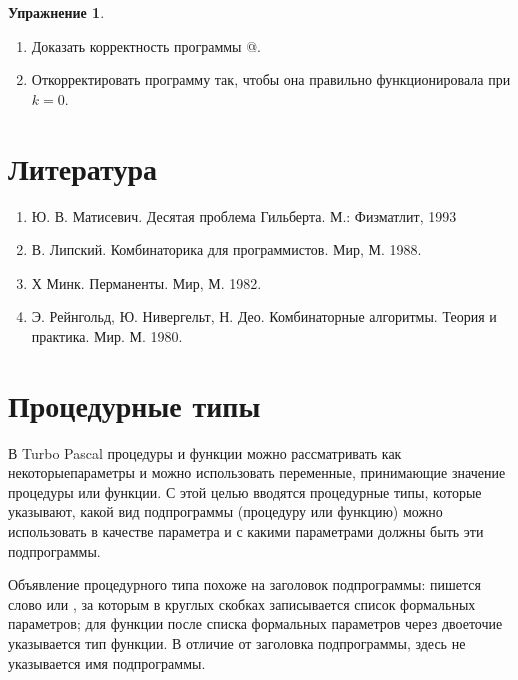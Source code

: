 \documentclass[12pt,a4paper]{article}
\theoremstyle{plain}
\theoremstyle{definition}
\newtheorem*{task}{Упражнение}
\theoremstyle{remark}
\newtheorem*{comment}{Комментарий}
\begin{document}
\begin{comment}
Стек реализуется таким же способом, как в \verb@SET4@. \verb@t[1]@ указывает на узел в вершине стека, и каждый элемент \verb@t[j]@ в стеке немедленно получает новое значение, как только он исключается из стека. Присваивания \verb@{1}@ и \verb@{2}@ служат для добавления в стек $m-1,\ldots,h+1$.
\end{comment}

\begin{task}
~\\
\begin{enumerate}
\item Доказать корректность программы @.
\item Откорректировать программу так, чтобы она правильно функционировала при $k=0$.
\end{enumerate}
\end{task}

\section*{Литература}
\begin{enumerate}
\item Ю. В. Матисевич. Десятая проблема Гильберта. М.: Физматлит, 1993
\item В. Липский. Комбинаторика для программистов. Мир, М. 1988.
\item Х Минк. Перманенты. Мир, М. 1982.
\item Э. Рейнгольд, Ю. Нивергельт, Н. Део. Комбинаторные алгоритмы. Теория и
практика. Мир. М. 1980.
\end{enumerate}

\section{Процедурные типы}

В Turbo Pascal процедуры и функции можно рассматривать как некоторыепараметры и можно использовать переменные, принимающие значение процедуры или функции. С этой целью вводятся процедурные типы, которые указывают, какой вид подпрограммы (процедуру или функцию) можно использовать в качестве параметра и с какими параметрами должны быть эти подпрограммы.

Объявление процедурного типа похоже на заголовок подпрограммы: пишется слово \verb@procedure@ или \verb@function@, за которым в круглых скобках записывается список формальных параметров; для функции после списка формальных параметров через двоеточие указывается тип функции. В отличие от заголовка подпрограммы, здесь не указывается имя подпрограммы.
\end{document}
